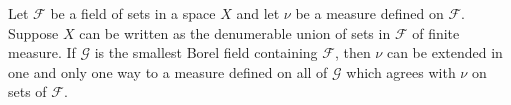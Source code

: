 Let $\mathcal{F}$ be a field of sets in a space $X$ and let $\nu$ be a measure defined on $\mathcal{F}$. Suppose $X$ can be written as the denumerable union of sets in $\mathcal{F}$ of finite measure. If $\mathcal{G}$ is the smallest Borel field containing $\mathcal{F}$, then $\nu$ can be extended in one and only one way to a measure defined on all of $\mathcal{G}$ which agrees with $\nu$ on sets of $\mathcal{F}$.
